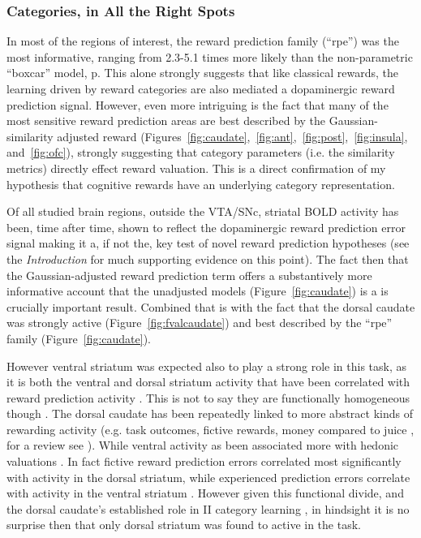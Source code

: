 \documentclass[doc,12pt]{apa}        %
\begin{document}
\subsubsection{Categories, in All the Right Spots}
\label{subsub:rightspots}
In most of the regions of interest, the reward prediction family (``rpe'') was the most informative, ranging from 2.3-5.1 times more likely than the non-parametric ``boxcar'' model, p\pageref{subsub:belowctx}.  This alone strongly suggests that like classical rewards, the learning driven by reward categories are also mediated a dopaminergic reward prediction signal.  However, even more intriguing is the fact that many of the most sensitive reward prediction areas are best described by the Gaussian-similarity adjusted reward (Figures~\ref{fig:caudate},~\ref{fig:ant},~\ref{fig:post},~\ref{fig:insula}, and~\ref{fig:ofc}), strongly suggesting that category parameters (i.e. the similarity metrics) directly effect reward valuation.  This is a direct confirmation of my hypothesis that cognitive rewards have an underlying category representation.    

Of all studied brain regions, outside the VTA/SNc, striatal BOLD activity has been, time after time, shown to reflect the dopaminergic reward prediction error signal making it a, if not the, key test of novel reward prediction hypotheses (see the \emph{Introduction} for much supporting evidence on this point).  The fact then that the Gaussian-adjusted reward prediction term offers a substantively more informative account that the unadjusted models (Figure~\ref{fig:caudate}) is a is crucially important result.  Combined that is with the fact that the dorsal caudate was strongly active (Figure~\ref{fig:fvalcaudate}) and best described by the ``rpe'' family (Figure~\ref{fig:caudate}).  
 
However ventral striatum was expected also to play a strong role in this task, as it is both the ventral and dorsal striatum activity that have been correlated with reward prediction activity \cite{ODoherty:2003p6329,Knutson:2007p1687,Schonberg:2007p518,Seger:2010p7188}.  This is not to say they are functionally homogeneous though \cite{Schonberg:2009p6669,ODoherty:2004p1269,Atallah:2007p1746}.  The dorsal caudate has been repeatedly linked to more abstract kinds of rewarding activity (e.g. task outcomes, fictive rewards, money compared to juice \cite{Tricomi:2008p6663,Lohrenz:2007p7240,Valentin:2009p7202}, for a review see ).  While ventral activity as been associated more with hedonic valuations \cite{ODoherty:2004p1269}.  In fact fictive reward prediction errors correlated most significantly with activity in the dorsal striatum, while experienced prediction errors correlate with activity in the ventral striatum \cite{Lohrenz:2007p7240}.  However given this functional divide, and the dorsal caudate's established role in II category learning \cite{Ashby:1998p9716}, in hindsight it is no surprise then that only dorsal striatum was found to active in the task.
\end{document}
